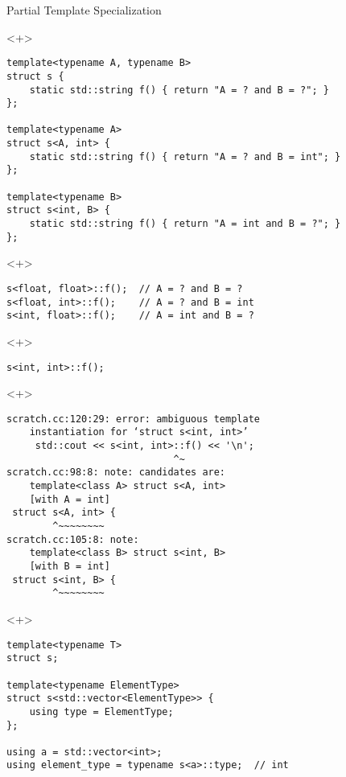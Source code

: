 \documentclass[table]{beamer}
\begin{document}
\begin{frame}[fragile]{Partial Template Specialization}
    \begin{onlyenv}<+>
\begin{verbatim}
template<typename A, typename B>
struct s {
    static std::string f() { return "A = ? and B = ?"; }
};

template<typename A>
struct s<A, int> {
    static std::string f() { return "A = ? and B = int"; }
};

template<typename B>
struct s<int, B> {
    static std::string f() { return "A = int and B = ?"; }
};
    \end{verbatim}
  \end{onlyenv}

  \begin{onlyenv}<+>
    \begin{verbatim}
s<float, float>::f();  // A = ? and B = ?
s<float, int>::f();    // A = ? and B = int
s<int, float>::f();    // A = int and B = ?
    \end{verbatim}
  \end{onlyenv}

  \begin{onlyenv}<+>
    \begin{verbatim}
s<int, int>::f();
    \end{verbatim}
  \end{onlyenv}

  \begin{onlyenv}<+>
    \begin{verbatim}
scratch.cc:120:29: error: ambiguous template
    instantiation for ‘struct s<int, int>’
     std::cout << s<int, int>::f() << '\n';
                             ^~
scratch.cc:98:8: note: candidates are:
    template<class A> struct s<A, int>
    [with A = int]
 struct s<A, int> {
        ^~~~~~~~~
scratch.cc:105:8: note:
    template<class B> struct s<int, B>
    [with B = int]
 struct s<int, B> {
        ^~~~~~~~~
    \end{verbatim}
  \end{onlyenv}

  \begin{onlyenv}<+>
    \begin{verbatim}
template<typename T>
struct s;

template<typename ElementType>
struct s<std::vector<ElementType>> {
    using type = ElementType;
};

using a = std::vector<int>;
using element_type = typename s<a>::type;  // int
    \end{verbatim}
  \end{onlyenv}
\end{frame}
\end{document}
